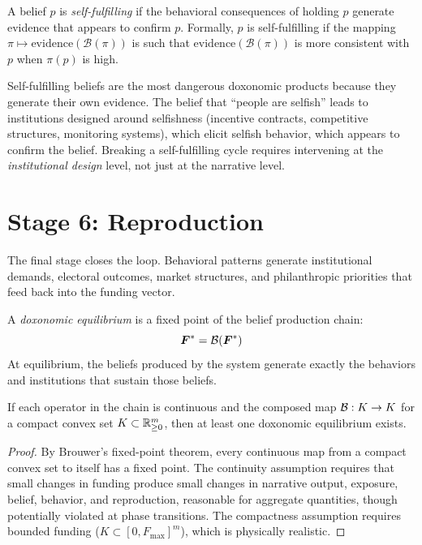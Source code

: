 \begin{definition}
\label{def:self-fulfilling}
A belief $p$ is \emph{self-fulfilling} if the behavioral consequences of holding $p$ generate evidence that appears to confirm $p$.
Formally, $p$ is self-fulfilling if the mapping $\pi \mapsto \text{evidence}(\mathcal{B}(\pi))$ is such that $\text{evidence}(\mathcal{B}(\pi))$ is more consistent with $p$ when $\pi(p)$ is high.
\end{definition}

Self-fulfilling beliefs are the most dangerous doxonomic products because they generate their own evidence.
The belief that ``people are selfish'' leads to institutions designed around selfishness (incentive contracts, competitive structures, monitoring systems), which elicit selfish behavior, which appears to confirm the belief.
Breaking a self-fulfilling cycle requires intervening at the \emph{institutional design} level, not just at the narrative level.


\section{Stage 6: Reproduction}
\label{sec:ch5-reproduction}

The final stage closes the loop.
Behavioral patterns generate institutional demands, electoral outcomes, market structures, and philanthropic priorities that feed back into the funding vector.

\begin{definition}
\label{def:doxonomic-equilibrium}
A \emph{doxonomic equilibrium} is a fixed point of the belief production chain:
\[
  \bm{F}^* = \mathcal{B}(\bm{F}^*)
\]
At equilibrium, the beliefs produced by the system generate exactly the behaviors and institutions that sustain those beliefs.
\end{definition}

\begin{theorem}
\label{thm:existence}
If each operator in the chain is continuous and the composed map $\mathcal{B}: K \to K$ for a compact convex set $K \subset \mathbb{R}^m_{\geq 0}$, then at least one doxonomic equilibrium exists.
\end{theorem}

\begin{proof}
By Brouwer's fixed-point theorem, every continuous map from a compact convex set to itself has a fixed point.
The continuity assumption requires that small changes in funding produce small changes in narrative output, exposure, belief, behavior, and reproduction, reasonable for aggregate quantities, though potentially violated at phase transitions.
The compactness assumption requires bounded funding ($K \subset [0, F_{\max}]^m$), which is physically realistic.
\end{proof}

